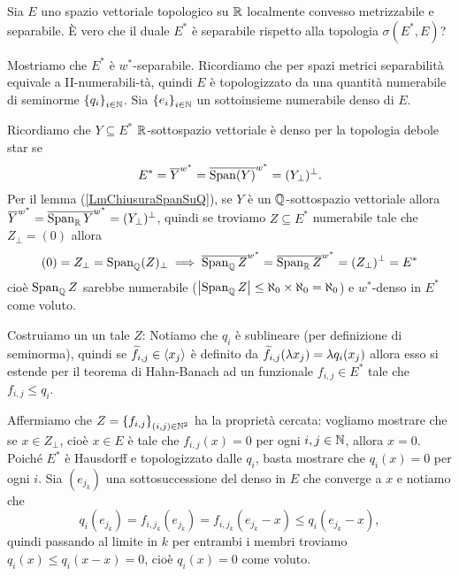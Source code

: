 \documentclass[a4paper]{article}
\begin{document}
\begin{exercise}
Sia $E$ uno spazio vettoriale topologico su $\mathbb{R}$ localmente convesso metrizzabile e separabile. \`E vero che il duale $E^\ast$ \`e separabile rispetto alla topologia $\sigma(E^\ast,E)$?
\end{exercise}
\begin{solution}
Mostriamo che $E^\ast$ \`e $w^\ast$-separabile. Ricordiamo che per spazi metrici separabilit\`a equivale a II-numerabili-t\`a, quindi $E$ \`e topologizzato da una quantit\`a numerabile di seminorme $\left\{{q_i}\right\}_{i\in \mathbb{N}}$. Sia $\left\{{e_i}\right\}_{i\in \mathbb{N}}$ un sottoinsieme numerabile denso di $E$. 

Ricordiamo che $Y\subseteq E^\ast$ $\mathbb{R}$-sottospazio vettoriale \`e denso per la topologia debole star se
\[E^\ast=\overline{Y}^{w^\ast}=\overline{\operatorname{Span}(Y)}^{w^\ast}=(Y_\perp)^\perp.\]
Per il lemma (\ref{LmChiusuraSpanSuQ}), se $Y$ \`e un $\mathbb{Q}$-sottospazio vettoriale allora $\overline{Y}^{w^\ast}=\overline{\operatorname{Span}_{\mathbb{R}} Y}^{w^\ast}=(Y_\perp)^\perp$, quindi se troviamo $Z\subseteq E^\ast$ numerabile tale che $Z_\perp=(0)$ allora 
\[(0)=Z_\perp=\operatorname{Span}_{\mathbb{Q}}(Z)_\perp\implies \overline{\operatorname{Span}_{\mathbb{Q}} Z}^{w^\ast}=\overline{\operatorname{Span}_{\mathbb{R}} Z}^{w^\ast}=(Z_\perp)^\perp=E^\ast\]
cio\`e $\operatorname{Span}_{\mathbb{Q}} Z$ sarebbe numerabile ($\left|{\operatorname{Span}_{\mathbb{Q}} Z}\right|\leq\aleph_0\times\aleph_0=\aleph_0$) e $w^\ast$-denso in $E^\ast$ come voluto.

\medskip

Costruiamo un un tale $Z$: Notiamo che $q_i$ \`e sublineare (per definizione di seminorma), quindi se $\widetilde{f}_{i,j}\in \left\langle {x_j}\right\rangle$ \`e definito da $\widetilde{f}_{i,j}(\lambda x_j)=\lambda q_i(x_j)$ allora esso si estende per il teorema di Hahn-Banach ad un funzionale $f_{i,j}\in E^\ast$ tale che $f_{i,j}\leq q_i$. 

Affermiamo che $Z=\left\{{f_{i,j}}\right\}_{(i,j)\in\mathbb{N}^2}$ ha la propriet\`a cercata: vogliamo mostrare che se $x\in Z_\perp$, cio\`e $x\in E$ \`e tale che $f_{i,j}(x)=0$ per ogni $i,j\in \mathbb{N}$, allora $x=0$. Poich\'e $E^\ast$ \`e Hausdorff e topologizzato dalle $q_i$, basta mostrare che $q_i(x)=0$ per ogni $i$. Sia $(e_{j_k})$ una sottosuccessione del denso in $E$ che converge a $x$ e notiamo che
\[q_i(e_{j_k})=f_{i,j_k}(e_{j_k})=f_{i,j_k}(e_{j_k}-x)\leq q_i(e_{j_k}-x),\]
quindi passando al limite in $k$ per entrambi i membri troviamo $q_i(x)\leq q_i(x-x)=0$, cio\`e $q_i(x)=0$ come voluto.
\end{solution}
\end{document}
